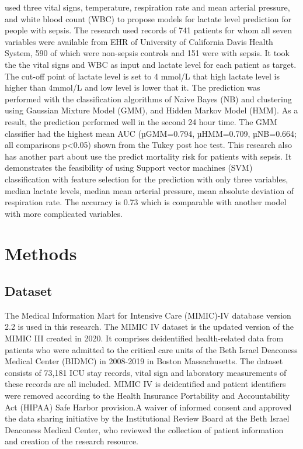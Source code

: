 \documentclass[12pt,a4paper,english
]{tunithesis}
\begin{document}
\textcite{gultepe2013} used three vital signs, temperature, respiration rate and mean arterial pressure, and white blood count (WBC) to propose models for lactate level prediction for people with sepsis. The research used records of 741 patients for whom all seven variables were available from EHR of University of California Davis Health System, 590 of which were non-sepsis controls and 151 were with sepsis. It took the the vital signs and WBC as input and lactate level for each patient as target. The cut-off point of lactate level is set to 4 mmol/L that high lactate level is higher than 4mmol/L and low level is lower that it. The prediction was performed with the classification algorithms of Naive Bayes (NB) and clustering using Gaussian Mixture Model (GMM), and Hidden Markov Model (HMM). As a result, the prediction performed well in the second 24 hour time. The GMM classifier had the highest mean AUC (µGMM=0.794, µHMM=0.709, µNB=0.664; all comparisons p<0.05) shown from the Tukey post hoc test. This research also has another part about use the predict mortality risk for patients with sepsis. It demonstrates the feasibility of using Support vector machines (SVM) classification with feature selection for the prediction with only three variables, median lactate levels, median mean arterial pressure, mean absolute deviation of respiration rate. The accuracy is 0.73 which is comparable with another model with more complicated variables.



\chapter{Methods}
\label{ch:methods}

\section{Dataset}
The Medical Information Mart for Intensive Care (MIMIC)-IV database version 2.2 is used in this research. \parencite{johnson2023} The MIMIC IV dataset is the updated version of the MIMIC III created in 2020. It comprises deidentified health-related data from patients who were admitted to the critical care units of the Beth Israel Deaconess Medical Center (BIDMC) in 2008-2019 in Boston Massachusetts. The dataset consists of 73,181 ICU stay records, vital sign and laboratory measurements of these records are all included. MIMIC IV is deidentified and patient identifiers were removed according to the Health Insurance Portability and Accountability Act (HIPAA) Safe Harbor provision.A waiver of informed consent and approved the data sharing initiative by the Institutional Review Board at the Beth Israel Deaconess Medical Center, who reviewed the collection of patient information and creation of the research resource. \parencite{johnson2023}
\end{document}
